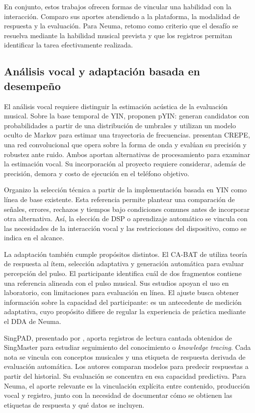 En conjunto, estos trabajos ofrecen formas de vincular una habilidad con la
interacción. Comparo sus aportes atendiendo a la plataforma, la modalidad de
respuesta y la evaluación. Para Neuma, retomo como criterio que el desafío se
resuelva mediante la habilidad musical prevista y que los registros permitan
identificar la tarea efectivamente realizada.

\subsection{Análisis vocal y adaptación basada en desempeño}
\label{sec:antecedentes-audio-adaptacion}
El análisis vocal requiere distinguir la estimación acústica de la evaluación
musical. Sobre la base temporal de YIN, \textcite{mauch2014pyin} proponen pYIN:
generan candidatos con probabilidades a partir de una distribución de umbrales
y utilizan un modelo oculto de Markov para estimar una trayectoria de frecuencias.
\textcite{kim2018crepe} presentan CREPE, una red convolucional que opera sobre
la forma de onda y evalúan su precisión y robustez ante ruido. Ambos aportan
alternativas de procesamiento para examinar la estimación vocal. Su incorporación
al proyecto requiere considerar, además de precisión, demora y costo de ejecución
en el teléfono objetivo.

Organizo la selección técnica a partir de la implementación basada en YIN como
línea de base existente. Esta referencia permite plantear una comparación de
señales, errores, rechazos y tiempos bajo condiciones comunes antes de incorporar
otra alternativa. Así, la elección de DSP o aprendizaje automático se vincula
con las necesidades de la interacción vocal y las restricciones del dispositivo,
como se indica en el alcance.

La adaptación también cumple propósitos distintos. El CA-BAT de
\textcite{harrison2018cabat} utiliza teoría de respuesta al ítem, selección
adaptativa y generación automática para evaluar percepción del pulso. El
participante identifica cuál de dos fragmentos contiene una referencia alineada
con el pulso musical. Sus estudios apoyan el uso en laboratorio, con limitaciones
para evaluación en línea. El ajuste busca obtener información sobre la capacidad
del participante: es un antecedente de medición adaptativa, cuyo propósito difiere
de regular la experiencia de práctica mediante el DDA de Neuma.

SingPAD, presentado por \textcite{zhang2024singpad}, aporta registros de lectura
cantada obtenidos de SingMaster para estudiar seguimiento del conocimiento
o \textit{knowledge tracing}. Cada nota se vincula con conceptos musicales y
una etiqueta de respuesta derivada de evaluación automática. Los autores comparan
modelos para predecir respuestas a partir del historial. Su evaluación se concentra
en esa capacidad predictiva. Para Neuma, el aporte relevante es la vinculación
explícita entre contenido, producción vocal y registro, junto con la necesidad
de documentar cómo se obtienen las etiquetas de respuesta y qué datos se incluyen.

